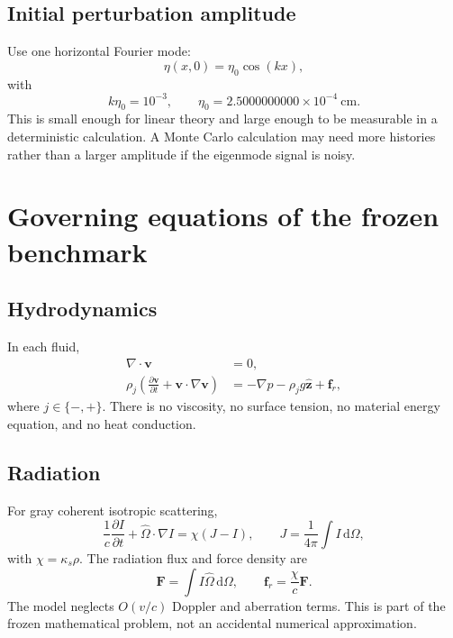 \documentclass[11pt]{article}
\newcommand{\vect}[1]{\bm{#1}}
\newcommand{\Oh}{\hat{\Omega}}
\newcommand{\dd}{\mathrm{d}}
\begin{document}
\subsection{Initial perturbation amplitude}
Use one horizontal Fourier mode:
\begin{equation}
\eta(x,0)=\eta_0\cos(kx),
\end{equation}
with
\begin{equation}
\boxed{k\eta_0=10^{-3},\qquad \eta_0=2.5000000000\times10^{-4}\ \mathrm{cm}.}
\end{equation}
This is small enough for linear theory and large enough to be measurable in a deterministic calculation. A Monte Carlo calculation may need more histories rather than a larger amplitude if the eigenmode signal is noisy.

\section{Governing equations of the frozen benchmark}

\subsection{Hydrodynamics}
In each fluid,
\begin{align}
\nabla\cdot\vect v&=0,\\
\rho_j\left(\frac{\partial\vect v}{\partial t}+\vect v\cdot\nabla\vect v\right)
&=-\nabla p-\rho_jg\hat{\vect z}+\vect f_r,
\end{align}
where $j\in\{-,+\}$. There is no viscosity, no surface tension, no material energy equation, and no heat conduction.

\subsection{Radiation}
For gray coherent isotropic scattering,
\begin{equation}
\frac{1}{c}\frac{\partial I}{\partial t}+\Oh\cdot\nabla I=\chi(J-I),
\qquad
J=\frac{1}{4\pi}\int I\,\dd\Omega,
\end{equation}
with $\chi=\kappa_s\rho$. The radiation flux and force density are
\begin{equation}
\vect F=\int I\Oh\,\dd\Omega,
\qquad
\boxed{\vect f_r=\frac{\chi}{c}\vect F.}
\end{equation}
The model neglects $O(v/c)$ Doppler and aberration terms. This is part of the frozen mathematical problem, not an accidental numerical approximation.
\end{document}
